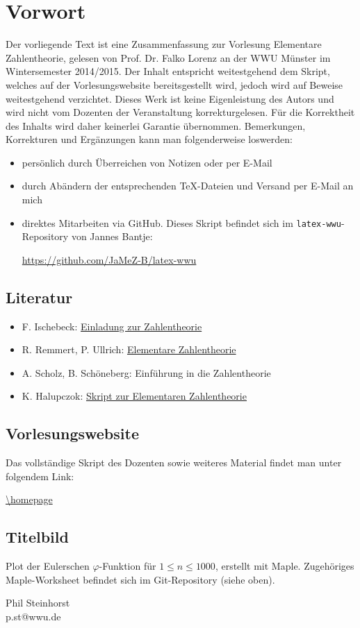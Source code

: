 \section*{Vorwort}
\label{sec:preface}
	Der vorliegende Text ist eine Zusammenfassung zur Vorlesung Elementare Zahlentheorie, gelesen von Prof. Dr. Falko Lorenz an der WWU Münster im Wintersemester 2014/2015. Der Inhalt entspricht weitestgehend dem Skript, welches auf der Vorlesungswebsite bereitsgestellt wird, jedoch wird auf Beweise weitestgehend verzichtet. Dieses Werk ist keine Eigenleistung des Autors und wird nicht vom Dozenten der Veranstaltung korrekturgelesen. Für die Korrektheit des Inhalts wird daher keinerlei Garantie übernommen. Bemerkungen, Korrekturen und Ergänzungen kann man folgenderweise loswerden:
	\begin{itemize}
		\item persönlich durch Überreichen von Notizen oder per E-Mail
		\item durch Abändern der entsprechenden TeX-Dateien und Versand per E-Mail an mich
		\item direktes Mitarbeiten via GitHub. Dieses Skript befindet sich im \texttt{latex-wwu}-Repository von Jannes Bantje:
		\begin{center}
			\url{https://github.com/JaMeZ-B/latex-wwu}
		\end{center}
	\end{itemize}

\subsection*{Literatur}
\label{sub:lit}
\begin{itemize}
	\item F. Ischebeck: \href{http://wwwmath.uni-muenster.de/u/ischebeck/}{Einladung zur Zahlentheorie}
	\item R. Remmert, P. Ullrich: \href{http://link.springer.com/book/10.1007/978-3-7643-7731-1}{Elementare Zahlentheorie}
	\item A. Scholz, B. Schöneberg: Einführung in die Zahlentheorie
	\item K. Halupczok: \href{http://wwwmath.uni-muenster.de/u/karin.halupczok/ElZthSS2009Skript.pdf}{Skript zur Elementaren Zahlentheorie}
\end{itemize}

\subsection*{Vorlesungswebsite}
\label{sub:link}
Das vollständige Skript des Dozenten sowie weiteres Material findet man unter folgendem Link:
\begin{center}
	\url{\homepage}
\end{center}

\subsection*{Titelbild}
\label{sub:titlepic}
Plot der Eulerschen $\varphi$-Funktion für $1 \leq n \leq 1000$, erstellt mit Maple. Zugehöriges Maple-Worksheet befindet sich im Git-Repository (siehe oben).

\vfill
\begin{flushright}
	Phil Steinhorst \\
	p.st@wwu.de
\end{flushright}
\newpage